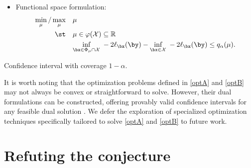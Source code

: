 \documentclass[11pt]{article}
\numberwithin{equation}{section}
\numberwithin{figure}{section}
\begin{document}
\begin{algorithm}[!ht]
\begin{algorithmic}[1]
\begin{itemize}[leftmargin=7mm]
\begin{equation}
\begin{aligned}
            \st \quad & \bx \in \mathcal X\\
            \quad & -2\ell_{\bx}(\by) \leq q_\alpha(\varphi(\bx))+ \inf_{\bx' \in \mathcal X} -2\ell_{\bx'}(\by). 
            \end{aligned}
            \end{equation}
    \item[II.]
    Functional space formulation:
            \begin{equation}\label{optB}
            \begin{aligned}
            \min_\mu/\max_{\mu} \quad &\mu \\
            \st \quad & \mu \in \varphi(\mathcal{X}) \subseteq \mathbb{R} \\ \quad & \underset{\bx \in \Phi_\mu \cap \mathcal{X}} {\text{inf}} \; -2\ell_{\bx}(\by)- \underset{\bx \in \mathcal{X}}{\text{inf}} \; -2 \ell_{\bx}(\by)\leq q_\alpha(\mu).
            \end{aligned}
            \end{equation}
\end{itemize}

\ENSURE Confidence interval with coverage $1-\alpha$.
\end{algorithmic}
\end{algorithm}

It is worth noting that the optimization problems defined in \eqref{optA} and \eqref{optB} may not always be convex or straightforward to solve. 
However, their dual formulations can be constructed, offering provably valid confidence intervals for any feasible dual solution \cite{stark1992inference}.
We defer the exploration of specialized optimization techniques specifically tailored to solve \eqref{optA} and \eqref{optB} to future work.

\section{Refuting the \rustburrus conjecture}\label{sec:rust_burrus}
\end{document}
